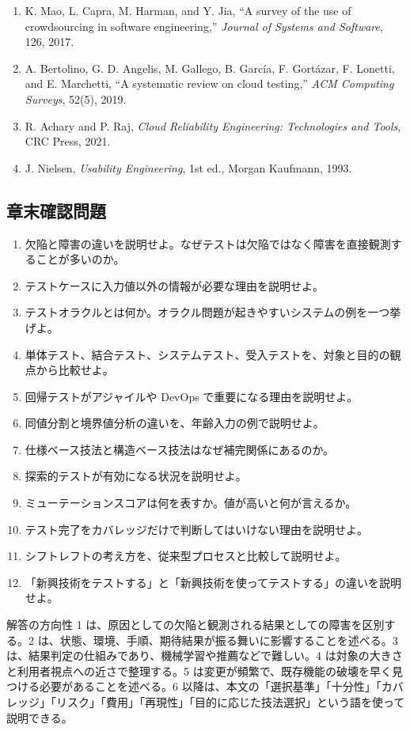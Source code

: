 \documentclass[a4paper,11pt]{ltjsarticle}
\numberwithin{figure}{section}
\numberwithin{table}{section}
\begin{document}
\begin{enumerate}[leftmargin=2.2em]
\item K. Mao, L. Capra, M. Harman, and Y. Jia, ``A survey of the use of crowdsourcing in software engineering,'' \textit{Journal of Systems and Software}, 126, 2017.
\item A. Bertolino, G. D. Angelis, M. Gallego, B. García, F. Gortázar, F. Lonetti, and E. Marchetti, ``A systematic review on cloud testing,'' \textit{ACM Computing Surveys}, 52(5), 2019.
\item R. Achary and P. Raj, \textit{Cloud Reliability Engineering: Technologies and Tools}, CRC Press, 2021.
\item J. Nielsen, \textit{Usability Engineering}, 1st ed., Morgan Kaufmann, 1993.
\end{enumerate}

\subsection{章末確認問題}
\begin{enumerate}[leftmargin=2em]
\item 欠陥と障害の違いを説明せよ。なぜテストは欠陥ではなく障害を直接観測することが多いのか。
\item テストケースに入力値以外の情報が必要な理由を説明せよ。
\item テストオラクルとは何か。オラクル問題が起きやすいシステムの例を一つ挙げよ。
\item 単体テスト、結合テスト、システムテスト、受入テストを、対象と目的の観点から比較せよ。
\item 回帰テストがアジャイルや DevOps で重要になる理由を説明せよ。
\item 同値分割と境界値分析の違いを、年齢入力の例で説明せよ。
\item 仕様ベース技法と構造ベース技法はなぜ補完関係にあるのか。
\item 探索的テストが有効になる状況を説明せよ。
\item ミューテーションスコアは何を表すか。値が高いと何が言えるか。
\item テスト完了をカバレッジだけで判断してはいけない理由を説明せよ。
\item シフトレフトの考え方を、従来型プロセスと比較して説明せよ。
\item 「新興技術をテストする」と「新興技術を使ってテストする」の違いを説明せよ。
\end{enumerate}

\begin{pointbox}{解答の方向性}
1 は、原因としての欠陥と観測される結果としての障害を区別する。2 は、状態、環境、手順、期待結果が振る舞いに影響することを述べる。3 は、結果判定の仕組みであり、機械学習や推薦などで難しい。4 は対象の大きさと利用者視点への近さで整理する。5 は変更が頻繁で、既存機能の破壊を早く見つける必要があることを述べる。6 以降は、本文の「選択基準」「十分性」「カバレッジ」「リスク」「費用」「再現性」「目的に応じた技法選択」という語を使って説明できる。
\end{pointbox}
\end{document}
